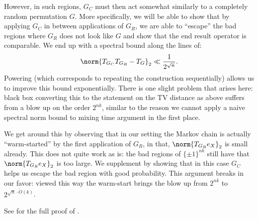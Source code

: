 However, in such regions, $G_C$ must then act somewhat similarly to a completely random permutation $G$. More specifically, we will be able to show that by applying $G_C$ in between applications of $G_R$, we are able to ``escape'' the bad regions where $G_R$ does not look like $G$ and show that the end result operator is comparable. We end up with a spectral bound along the lines of:
\begin{equation*}
    \norm{T_{G_C}T_{G_R} - T_G}_{2} \ll \frac{1}{2^{\sqrt{n}}}.
\end{equation*}
Powering (which corresponds to repeating the construction sequentially) allows us to improve this bound exponentially. There is one slight problem that arises here: black box converting this to the statement on the TV distance as above suffers from a blow up on the order $2^{nk}$, similar to the reason we cannot apply a naive spectral norm bound to mixing time argument in the first place.

We get around this by observing that in our setting the Markov chain is actually ``warm-started'' by the first application of $G_R$, in that, $\norm{T_{G_R}e_X}_{2}$ is small already. This does not quite work as is: the bad regions of $\{\pm1\}^{nk}$ still have that $\norm{T_{G_R}e_X}_{2}$ is too large. We supplement by showing that in this case $G_C$ helps us escape the bad region with good probability. This argument breaks in our favor: viewed this way the warm-start brings the blow up from $2^{nk}$ to $2^{\sqrt{n} \cdot \widetilde{O}(k)}$.

See  for the full proof of .
